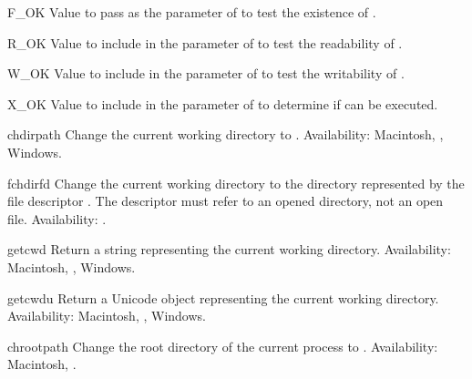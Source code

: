 \begin{datadesc}{F_OK}
  Value to pass as the  parameter of  to
  test the existence of .
\end{datadesc}

\begin{datadesc}{R_OK}
  Value to include in the  parameter of 
  to test the readability of .
\end{datadesc}

\begin{datadesc}{W_OK}
  Value to include in the  parameter of 
  to test the writability of .
\end{datadesc}

\begin{datadesc}{X_OK}
  Value to include in the  parameter of 
  to determine if  can be executed.
\end{datadesc}

\begin{funcdesc}{chdir}{path}
Change the current working directory to .
Availability: Macintosh, \UNIX, Windows.
\end{funcdesc}

\begin{funcdesc}{fchdir}{fd}
Change the current working directory to the directory represented by
the file descriptor .  The descriptor must refer to an opened
directory, not an open file.
Availability: \UNIX.
\end{funcdesc}

\begin{funcdesc}{getcwd}{}
Return a string representing the current working directory.
Availability: Macintosh, \UNIX, Windows.
\end{funcdesc}

\begin{funcdesc}{getcwdu}{}
Return a Unicode object representing the current working directory.
Availability: Macintosh, \UNIX, Windows.
\end{funcdesc}

\begin{funcdesc}{chroot}{path}
Change the root directory of the current process to .
Availability: Macintosh, \UNIX.
\end{funcdesc}

